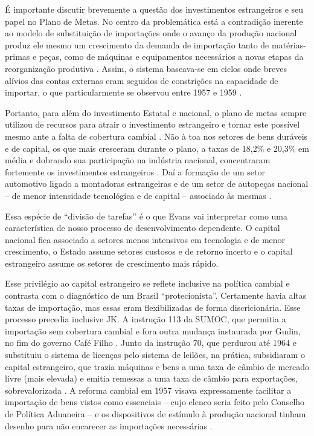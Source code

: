 É importante discutir brevemente a questão dos investimentos
estrangeiros e seu papel no Plano de Metas. No centro da problemática
está a contradição inerente ao modelo de substituição de importações
onde o avanço da produção nacional produz ele mesmo um crescimento da
demanda de importação tanto de matérias-primas e peças, como de máquinas
e equipamentos necessários a novas etapas da reorganização produtiva
\citep{tavares_da_1973}. Assim, o sistema baseava-se em ciclos onde breves alívios das
contas externas eram seguidos de constrições na capacidade de importar,
o que particularmente se observou entre 1957 e 1959 \citep{abreu_ordem_2014}.

Portanto, para além do investimento Estatal e nacional, o plano de metas
sempre utilizou de recursos para atrair o investimento estrangeiro e
tornar este possível mesmo ante a falta de cobertura cambial \citep{abreu_ordem_2014}.
Não à toa nos setores de bens duráveis e de capital, os que mais
cresceram durante o plano, a taxas de 18,2\% e 20,3\% em média e
dobrando sua participação na indústria nacional, concentraram fortemente
os investimentos estrangeiros \citep{villela_dos_2025}. Daí a formação de um setor
automotivo ligado a montadoras estrangeiras e de um setor de autopeças
nacional -- de menor intensidade tecnológica e de capital -- associado
às mesmas \citep{villela_dos_2025}.

Essa espécie de ``divisão de tarefas'' é o que Evans \citeyearpar{evans_dependent_1979}
vai interpretar como uma característica de nosso processo de desenvolvimento dependente.
O capital nacional fica associado a setores menos intensivos em
tecnologia e de menor crescimento, o Estado assume setores custosos e de
retorno incerto e o capital estrangeiro assume os setores de crescimento
mais rápido.

Esse privilégio ao capital estrangeiro se reflete inclusive na política
cambial e contrasta com o diagnóstico de um Brasil ``protecionista''.
Certamente havia altas taxas de importação, mas essas eram
flexibilizadas de forma discricionária. Esse processo precedia inclusive
JK. A instrução 113 da SUMOC, que permitia a importação sem cobertura
cambial e fora outra mudança instaurada por Gudin, no fim do governo
Café Filho \citep{villela_dos_2025}. Junto da instrução 70, que perdurou até 1964 e
substituiu o sistema de licenças pelo sistema de leilões, na prática,
subsidiaram o capital estrangeiro, que trazia máquinas e bens a uma taxa
de câmbio de mercado livre (mais elevada) e emitia remessas a uma taxa
de câmbio para exportações, sobrevalorizada \citep{villela_dos_2025}. A reforma cambial
em 1957 visava expressamente facilitar a importação de bens vistos como
essenciais -- cujo elenco seria feito pelo Conselho de Política
Aduaneira -- e os dispositivos de estímulo à produção nacional tinham
desenho para não encarecer as importações necessárias  \citep{abreu_ordem_2014}.


